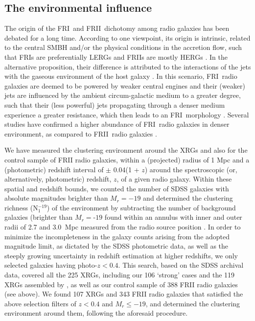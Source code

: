 \documentclass[twocolumn]{aastex62}
\def\frii{FR{II}~}
\def\fri{FR{I}}
\begin{document}
\subsection{The environmental influence}


 The origin of the \fri\ and \frii dichotomy among radio galaxies has been 
 debated  for a long time. According to one viewpoint, its origin is intrinsic, 
 related to the central SMBH and/or the physical conditions in the 
 accretion flow, such that FRIs are preferentially LERGs and FRIIs are 
 mostly HERGs
 \citep{Marchesini2004MNRAS.351..733M,Hardcastle2006MNRAS.370.1893H,Kauffmann2008MNRAS.384..953K}.
 In the alternative proposition, their difference is attributed to the 
 interactions of the jets with the gaseous environment of the host galaxy
  \citep{Kawakatu2009ApJ...697L.173K,Lin2010ApJ...723.1119L,Capetti2017A&A...601A..81C}.
 In this scenario, \fri\ radio galaxies are deemed to be powered by weaker 
 central engines and their (weaker) jets are influenced by the ambient 
 circum-galactic medium to a greater degree, such that their (less 
 powerful) jets propagating through a denser medium experience a greater 
 resistance, which then leads to an \fri\ morphology
 \citep{Gopal1988Natur.333...49G,Gopal2000A&A...363..507G,
 Gopal2001A&A...373..100G,Kaiser2007MNRAS.381.1548K}.
Several studies have confirmed a higher abundance of \fri\ radio 
galaxies in denser environment, as compared to \frii radio galaxies 
 \citep{Gendre2013MNRAS.430.3086G, Rodman2019MNRAS.482.5625R}. 


We have measured the clustering environment around the XRGs and also
for the control sample of FRII radio galaxies, within a (projected)
radius of 1 Mpc and a (photometric) redshift interval of $\pm$ 0.04(1
+ $z$) around the spectroscopic (or, alternatively, photometric)
redshift, $z$, of a given radio galaxy. Within these spatial and
redshift bounds, we counted the number of SDSS galaxies with absolute
magnitudes brighter than $M_r = - 19 $ and determined the clustering
richness (N${^{- 19}_{1}}$) of the environment by subtracting the
number of background galaxies (brighter than $M_r = $-$ 19 $ found
within an annulus with inner and outer radii of 2.7 and 3.0  Mpc
measured from the radio source position
\citep{Wen2012ApJS..199...34W,Gendre2013MNRAS.430.3086G}. In order to
minimize the incompleteness in the galaxy counts arising from the
adopted magnitude limit, as dictated by the SDSS photometric data, as
well as the steeply growing uncertainty in redshift estimation at
higher redshifts, we only selected galaxies having photo-$z < 0.4$.
This search, based on the SDSS archival data, covered all the 225
XRGs, including our 106 `strong' cases and the 119 XRGs assembled by
\citet{Cheung2007AJ....133.2097C}, as well as our control sample of
388 FRII radio galaxies (see above). We found 107 XRGs and 343 FRII
radio galaxies that satisfied the above selection filters of $z < 0.4$
and $M_r \le -19$, and determined the clustering environment around
them, following the aforesaid procedure. \par
\end{document}
